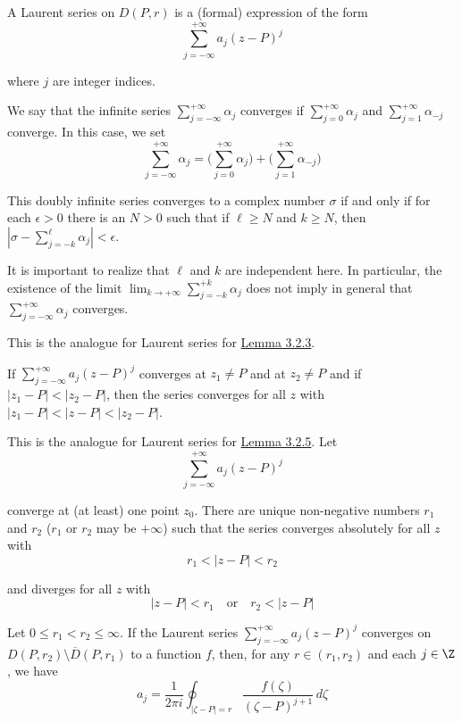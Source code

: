 \label{cb20929}

A Laurent series on $D(P,r)$ is a (formal) expression of the form
$$
  \sum_{j=-\infty}^{+\infty} a_j(z-P)^j
$$

where $j$ are integer indices.

We say that the infinite series $\sum_{j=-\infty}^{+\infty}\alpha_j$ converges
if $\sum_{j=0}^{+\infty}\alpha_j$ and $\sum_{j=1}^{+\infty}\alpha_{-j}$
converge. In this case, we set
$$
  \sum_{j=-\infty}^{+\infty}\alpha_j=
  \bigg(\sum_{j=0}^{+\infty}\alpha_j\bigg)+
  \bigg(\sum_{j=1}^{+\infty}\alpha_{-j}\bigg)
$$

This doubly infinite series converges to a complex number $\sigma$ if and only
if for each $\epsilon>0$ there is an $N>0$ such that if $\ell\geq N$ and $k\geq
N$, then $|\sigma-\sum_{j=-k}^\ell\alpha_j|<\epsilon$.

It is important to realize that $\ell$ and $k$ are independent here. In
particular, the existence of the limit
$\lim_{k\to+\infty}\sum_{j=-k}^{+k}\alpha_j$ does not imply in general that
$\sum_{j=-\infty}^{+\infty}\alpha_j$ converges.

\label{d5253d9}

This is the analogue for Laurent series for \href{d5d5bdc}{Lemma 3.2.3}.

If $\sum_{j=-\infty}^{+\infty}a_j(z-P)^j$ converges at $z_1\neq P$ and at
$z_2\neq P$ and if $|z_1-P|<|z_2-P|$, then the series converges for all $z$
with $|z_1-P|<|z-P|<|z_2-P|$.

\label{a9a7710}

This is the analogue for Laurent series for \href{c7d0e1d}{Lemma 3.2.5}. Let
$$
  \sum_{j=-\infty}^{+\infty}a_j(z-P)^j
$$

converge at (at least) one point $z_0$. There are unique non-negative numbers
$r_1$ and $r_2$ ($r_1$ or $r_2$ may be $+\infty$) such that the series
converges absolutely for all $z$ with
$$
  r_1<|z-P|<r_2
$$

and diverges for all $z$ with
$$
  |z-P|<r_1\quad\text{or}\quad r_2<|z-P|
$$

\label{eafd61e}

Let $0\leq r_1<r_2\leq\infty$. If the Laurent series
$\sum_{j=-\infty}^{+\infty}a_j(z-P)^j$ converges on $D(P,r_2)\setminus\overline
D(P,r_1)$ to a function $f$, then, for any $r\in(r_1,r_2)$ and each $j\in\Z$,
we have
$$
  a_j=\frac1{2\pi i}\oint_{|\zeta-P|=r}\frac{f(\zeta)}{(\zeta-P)^{j+1}}\,d\zeta
$$

